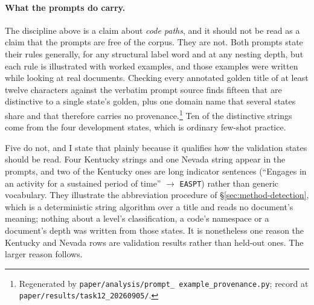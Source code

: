 \paragraph{What the prompts do carry.}
\label{sec:method-discipline}
The discipline above is a claim about \emph{code paths}, and it should not be
read as a claim that the prompts are free of the corpus. They are not. Both
prompts state their rules generally, for any structural label word and at any
nesting depth, but each rule is illustrated with worked examples, and those
examples were written while looking at real documents. Checking every annotated
golden title of at least twelve characters against the verbatim prompt source
finds fifteen that are distinctive to a single state's golden, plus one domain
name that several states share and that therefore carries no
provenance.\footnote{\raggedright Regenerated by
  \texttt{paper/\allowbreak analysis/\allowbreak prompt\_\allowbreak
  example\_\allowbreak provenance.py}; record at
\texttt{paper/\allowbreak results/\allowbreak task12\_20260905/}.}
Ten of the distinctive strings come
from the four development states, which is ordinary few-shot practice.

Five do not, and I state that plainly because it qualifies how the validation
states should be read. Four Kentucky strings and one Nevada string appear in the
prompts, and two of the Kentucky ones are long indicator sentences
(``Engages in an activity for a sustained period of time'' $\rightarrow$
\texttt{EASPT}) rather than generic vocabulary. They illustrate the
abbreviation procedure of \S\ref{sec:method-detection}, which is a deterministic
string algorithm over a title and reads no document's meaning; nothing about a
level's classification, a code's namespace or a document's depth was written
from those states. It is nonetheless one reason the Kentucky and Nevada rows
are validation results rather than held-out ones. The larger reason follows.

